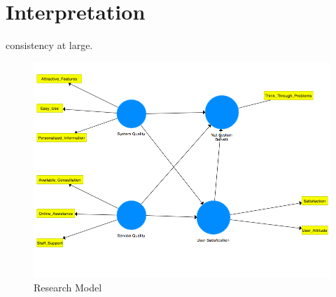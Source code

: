 \section{Interpretation}
\label{sec:vergleich}

consistency at large. 




\begin{figure}[h]
\centering
\includegraphics[width=1\textwidth]{Grafiken/Research_Model.png}
\caption{Research Model}
\label{Research Model}
\end{figure}